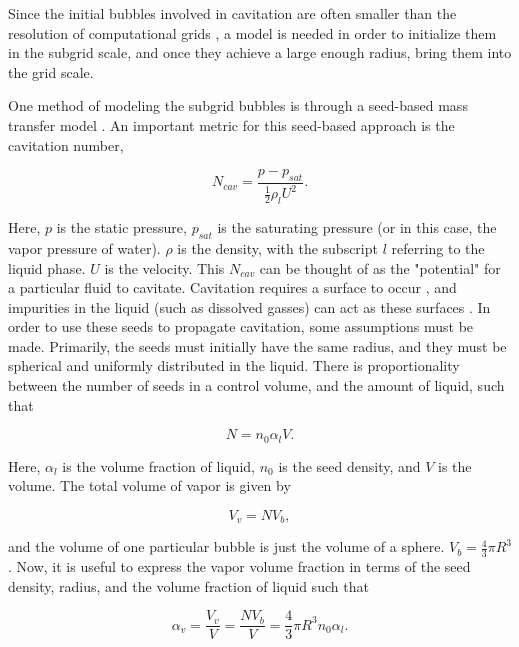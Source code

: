 \documentclass{UCF_ETD}
\begin{document}
Since the initial bubbles involved in cavitation are often smaller than the resolution of computational grids \cite{CAUPIN20061000}, a model is needed in order to initialize them in the subgrid scale, and once they achieve a large enough radius, bring them into the grid scale. 

One method of modeling the subgrid bubbles is through a seed-based mass transfer model \cite{Sauer2000InstationrKS}. An important metric for this seed-based approach is the cavitation number,

\begin{equation}
    N_{cav} = \frac{p - p_{sat}}{\frac{1}{2}\rho_{l}U^{2}}.
    \label{eq:cavitationNumber}
\end{equation}

Here, $p$ is the static pressure, $p_{sat}$ is the saturating pressure (or in this case, the vapor pressure of water). $\rho$ is the density, with the subscript $l$ referring to the liquid phase. $U$ is the velocity. This $N_{cav}$ can be thought of as the "potential" for a particular fluid to cavitate. Cavitation requires a surface to occur \cite{CAUPIN20061000}, and impurities in the liquid (such as dissolved gasses) can act as these surfaces \cite{starccm}. In order to use these seeds to propagate cavitation, some assumptions must be made. Primarily, the seeds must initially have the same radius, and they must be spherical and uniformly distributed in the liquid. There is proportionality between the number of seeds in a control volume, and the amount of liquid, such that

\begin{equation}
    N = n_{0}\alpha_{l}V.
    \label{eq:num_seeds}
\end{equation}

Here, $\alpha_{l}$ is the volume fraction of liquid, $n_{0}$ is the seed density, and $V$ is the volume. The total volume of vapor is given by

\begin{equation}
    V_{v} = N V_{b},
    \label{eq:total_vapor_volume}
\end{equation}

and the volume of one particular bubble is just the volume of a sphere. $V_{b} = \frac{4}{3}\pi R^{3}$. Now, it is useful to express the vapor volume fraction in terms of the seed density, radius, and the volume fraction of liquid such that

\begin{equation}
    \alpha_{v} = \frac{V_{v}}{V} = \frac{NV_{b}}{V} = \frac{4}{3}\pi R^{3} n_{0} \alpha_{l}.
    \label{eq:vapor_volume_fraction}
\end{equation}
\end{document}
